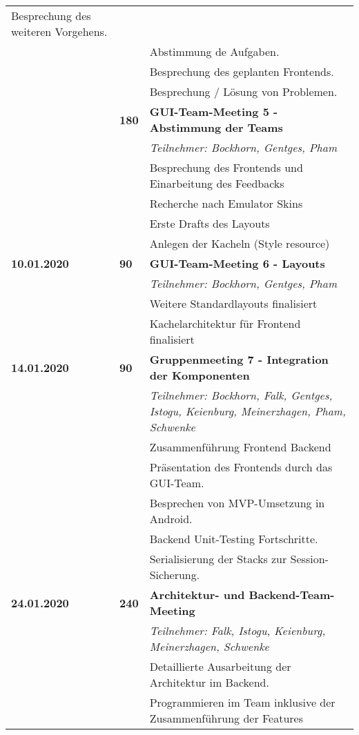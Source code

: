{{\begin{longtable}{|l|l|p{11cm}|}
			Besprechung des weiteren Vorgehens.
			\\ & &
			Abstimmung de Aufgaben.
			\\ & &
			Besprechung des geplanten Frontends.
			\\ & &
			Besprechung / Lösung von Problemen.
		\\ \cline{2-3}
		& \textbf{\hfill180} & \textbf{GUI-Team-Meeting 5 - Abstimmung der Teams} 
			\\ & &
			\small{\textit{Teilnehmer: Bockhorn, Gentges, Pham}}
			\\ & &
			Besprechung des Frontends und Einarbeitung des Feedbacks
			\\ & &
			Recherche nach Emulator Skins
			\\ & &
			Erste Drafts des Layouts
			\\ & &
			Anlegen der Kacheln (Style resource)	
	\\ \hline
		\textbf{10.01.2020} 
			& \textbf{\hfill90} & \textbf{GUI-Team-Meeting 6 - Layouts}
			\\ & &
			\small{\textit{Teilnehmer: Bockhorn, Gentges, Pham}}
			\\ & &
			Weitere Standardlayouts finalisiert
			\\ & &
			Kachelarchitektur für Frontend finalisiert			
	\\ \hline
		\textbf{14.01.2020} 
			& \textbf{\hfill90} & \textbf{Gruppenmeeting 7 - Integration der Komponenten}
			\\ & &
			\small{\textit{Teilnehmer: Bockhorn, Falk, Gentges, Istogu, Keienburg, Meinerzhagen, Pham, Schwenke}}
			\\ & &
			Zusammenführung Frontend Backend
			\\ & &
			Präsentation des Frontends durch das GUI-Team.
			\\ & &
			Besprechen von MVP-Umsetzung in Android.
			\\ & &
			Backend Unit-Testing Fortschritte.
			\\ & &
			Serialisierung der Stacks zur Session-Sicherung.
	\\ \hline
		\textbf{24.01.2020} & 
			\textbf{\hfill240} & \textbf{Architektur- und Backend-Team-Meeting}
			\\ & &
			\small{\textit{Teilnehmer: Falk, Istogu, Keienburg, Meinerzhagen, Schwenke}}
			\\ & &
			Detaillierte Ausarbeitung der Architektur im Backend.
			\\ & &
			Programmieren im Team inklusive der Zusammenführung der Features

\end{longtable}}}

